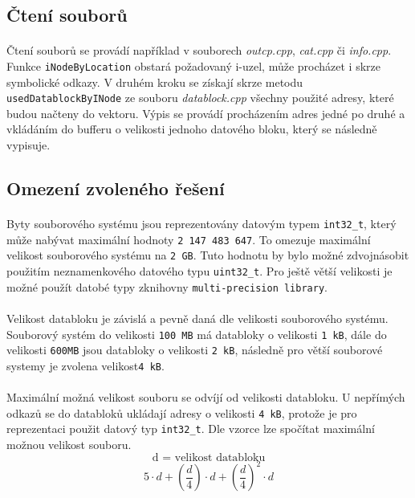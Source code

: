 \documentclass[12pt]{scrartcl}
\begin{document}
\subsection{Čtení souborů}
\paragraph{}
Čtení souborů se provádí například v souborech \textit{{outcp.cpp}}, \textit{{cat.cpp}} či \textit{{info.cpp}}. Funkce  \texttt{iNodeByLocation} obstará požadovaný i-uzel, může procházet i skrze symbolické odkazy. V druhém kroku se získají skrze metodu \texttt{{usedDatablockByINode}} ze souboru \textit{{datablock.cpp}} všechny použité adresy, které budou načteny do vektoru. Výpis se provádí procházením adres jedné po druhé a vkládáním do bufferu o velikosti jednoho datového bloku, který se následně vypisuje.

\subsection{Omezení zvoleného řešení}
\paragraph{}
Byty souborového systému jsou reprezentovány datovým typem \texttt{int32\_t}, který může nabývat maximální hodnoty \texttt{2 147 483 647}. To omezuje maximální velikost souborového systému na \texttt{2 GB}. Tuto hodnotu by bylo možné zdvojnásobit použitím neznamenkového datového typu \texttt{uint32\_t}. Pro ještě větší velikosti je možné použít datobé typy z\nobreakspace knihovny \texttt{multi-precision library}.
\paragraph{}
Velikost databloku je závislá a pevně daná dle velikosti souborového systému. Souborový systém do velikosti \texttt{100 MB} má databloky o velikosti \texttt{1 kB}, dále do velikosti \texttt{600\nobreakspace MB} jsou databloky o velikosti \texttt{2 kB}, následně pro větší souborové systemy je zvolena velikost\nobreakspace \texttt{4 kB}.
\paragraph{}
Maximální možná velikost souboru se odvíjí od velikosti databloku. U nepřímých odkazů se do databloků ukládají adresy o velikosti \texttt{4 kB}, protože je pro reprezentaci použit datový typ \texttt{int32\_t}. Dle vzorce lze spočítat maximální možnou velikost souboru.\\
$$
\text{d = velikost databloku}
$$
$$
5 \cdot d + \left( \dfrac{d}{4} \right) \cdot d + \left( \dfrac{d}{4} \right) ^2  \cdot d
$$
\end{document}
